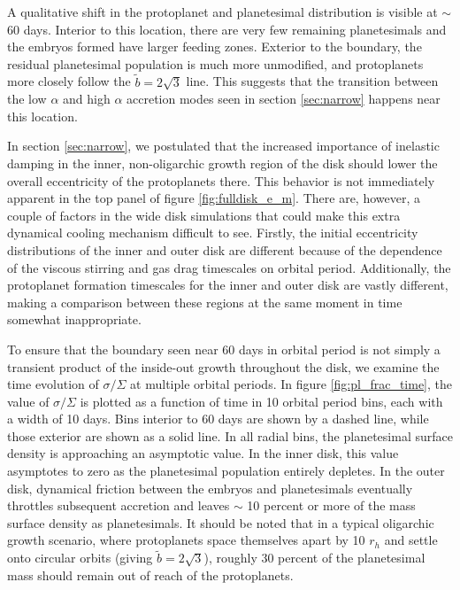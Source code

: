 \documentclass[twocolumn]{aastex63}
\begin{document}
A qualitative shift in the protoplanet and planetesimal distribution is visible at $\sim$ 60 days. Interior to this location, there are 
very few remaining planetesimals and the embryos formed have larger feeding zones. Exterior to the boundary, the residual 
planetesimal population is much more unmodified, and protoplanets more closely follow the $\tilde{b} = 2 \sqrt{3}$ line. This 
suggests that the transition between the low $\alpha$ and high $\alpha$ accretion modes seen in section \ref{sec:narrow} 
happens near this location.

In section \ref{sec:narrow}, we postulated that the increased importance of inelastic damping in the inner, non-oligarchic growth 
region of the disk should lower the overall eccentricity of the protoplanets there. This behavior is not immediately apparent in the 
top panel of figure \ref{fig:fulldisk_e_m}. There are, however, a couple of factors in the wide disk simulations that could make this 
extra dynamical cooling mechanism difficult to see. Firstly, the initial eccentricity distributions of the inner and outer disk are 
different because of the dependence of the viscous stirring and gas drag timescales on orbital period. Additionally, the 
protoplanet formation timescales for the inner and outer disk are vastly different, making a comparison between these regions at 
the same moment in time somewhat inappropriate.

To ensure that the boundary seen near 60 days in orbital period is not
simply a transient product of the inside-out growth throughout the
disk, we examine the time evolution of $\sigma/\Sigma$ at multiple
orbital periods. In figure \ref{fig:pl_frac_time}, the value of
$\sigma/\Sigma$ is plotted as a function of time in 10 orbital period
bins, each with a width of 10 days.
Bins interior to 60 days are shown by a dashed line, while those exterior are shown as a solid line. In all radial bins, the 
planetesimal surface density is approaching an asymptotic value. In the inner disk, this value asymptotes to zero as the 
planetesimal population entirely depletes. In the outer disk, dynamical friction between the embryos and planetesimals 
eventually throttles subsequent accretion and leaves $\sim$ 10 percent or more of the mass surface density as planetesimals. It 
should be noted that in a typical oligarchic growth scenario, where protoplanets space themselves apart by 10 $r_{h}$ and settle 
onto circular orbits (giving $\tilde{b} = 2 \sqrt{3}$), roughly 30 percent of the planetesimal mass should remain out of reach of the 
protoplanets.
\end{document}
